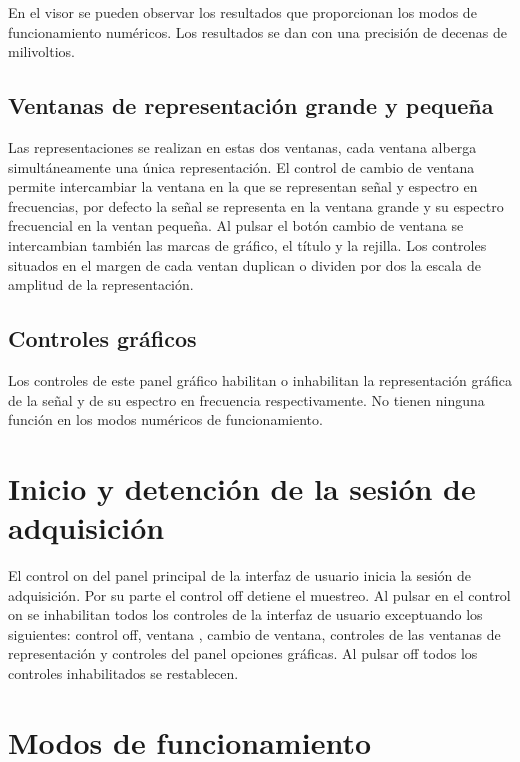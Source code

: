 En el visor se pueden observar los resultados que proporcionan los modos de
funcionamiento numéricos. Los resultados se dan con una precisión de
decenas de milivoltios.


\subsection{Ventanas de representación grande y
pequeña}\label{subsec:windows}

Las representaciones se realizan en estas dos ventanas, cada ventana
alberga simultáneamente una única representación. El control de cambio de
ventana permite intercambiar la ventana en la que se representan señal y
espectro en frecuencias, por defecto la señal se representa en la ventana
grande y su espectro frecuencial en la ventan pequeña. Al pulsar el botón
cambio de ventana se intercambian también las marcas de gráfico, el título
y la rejilla. Los controles situados en el margen de cada ventan duplican o
dividen por dos la escala de amplitud de la representación.

\subsection{Controles gráficos}\label{subsec:gfoptions}

Los controles de este panel gráfico habilitan o inhabilitan la
representación gráfica de la señal y de su espectro en frecuencia
respectivamente. No tienen ninguna función en los modos numéricos de
funcionamiento.


\section{Inicio y detención de la sesión de adquisición}

El control on del panel principal de la interfaz de usuario inicia la
sesión de adquisición. Por su parte el control off detiene el muestreo. Al
pulsar en el control on se inhabilitan todos los controles de la interfaz
de usuario exceptuando los siguientes: control off, ventana ,
cambio de ventana, controles de las ventanas de representación y controles
del panel opciones gráficas. Al pulsar off todos los controles
inhabilitados se restablecen.


\section{Modos de funcionamiento}

